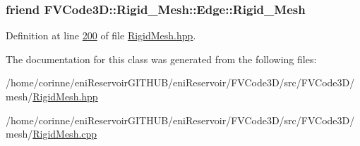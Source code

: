\subsubsection[{\texorpdfstring{Rigid\+\_\+\+Mesh}{Rigid_Mesh}}]{\setlength{\rightskip}{0pt plus 5cm}friend F\+V\+Code3\+D\+::\+Rigid\+\_\+\+Mesh\+::\+Edge\+::\+Rigid\+\_\+\+Mesh}\hypertarget{classFVCode3D_1_1Rigid__Mesh_1_1Edge_a921de775da515749f902ff8cdc682f30}{}\label{classFVCode3D_1_1Rigid__Mesh_1_1Edge_a921de775da515749f902ff8cdc682f30}


Definition at line \hyperlink{RigidMesh_8hpp_source_l00200}{200} of file \hyperlink{RigidMesh_8hpp_source}{Rigid\+Mesh.\+hpp}.



The documentation for this class was generated from the following files\+:\begin{DoxyCompactItemize}
\item 
/home/corinne/eni\+Reservoir\+G\+I\+T\+H\+U\+B/eni\+Reservoir/\+F\+V\+Code3\+D/src/\+F\+V\+Code3\+D/mesh/\hyperlink{RigidMesh_8hpp}{Rigid\+Mesh.\+hpp}\item 
/home/corinne/eni\+Reservoir\+G\+I\+T\+H\+U\+B/eni\+Reservoir/\+F\+V\+Code3\+D/src/\+F\+V\+Code3\+D/mesh/\hyperlink{RigidMesh_8cpp}{Rigid\+Mesh.\+cpp}\end{DoxyCompactItemize}
